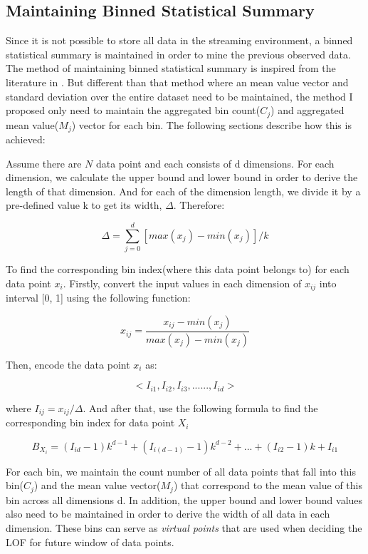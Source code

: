 \documentclass[11pt]{article}       %
\begin{document}
\subsection{Maintaining Binned Statistical Summary} \label{subsect2}

Since it is not possible to store all data in the streaming environment, a binned statistical summary is maintained in order to mine the previous observed data. The method of maintaining binned statistical summary is inspired from the literature in \cite{7516110}. But different than that method where an mean value vector and standard deviation over the entire dataset need to be maintained, the method I proposed only need to maintain the aggregated bin count($C_j$) and aggregated mean value($M_j$) vector for each bin. The following sections describe how this is achieved:

Assume there are $N$ data point and each consists of d dimensions. For each dimension, we calculate the upper bound and lower bound in order to derive the length of that dimension. And for each of the dimension length, we divide it by a pre-defined value k to get its width, $\Delta$.  Therefore:

\[ \Delta = \sum_{j=0}^{d} [max(x_j) - min(x_j)] / k \]

To find the corresponding bin index(where this data point belongs to) for each data point $x_i$. Firstly, convert the input values in each dimension of $x_{ij}$ into interval [0, 1] using the following function:

\[ x_{ij} = \frac{x_{ij} - min(x_j)}{max(x_j) - min(x_j)} \]

Then, encode the data point $x_i$ as:

\[ <I_{i1}, I_{i2}, I_{i3}, ......, I_{id}> \]

where $I_{ij} = x_{ij} / \Delta$. And after that, use the following formula to find the corresponding bin index for data point $X_i$

\begin{equation} \label{bin_index}
B_{X_{i}} = (I_{id} - 1)k^{d-1} + (I_{i(d-1)} - 1)k^{d-2} + ... + (I_{i2} -1)k + I_{i1}
\end{equation}

For each bin, we maintain the count number of all data points that fall into this bin($C_j$) and the mean value vector($M_j$) that correspond to the mean value of this bin across all dimensions d. In addition, the upper bound and lower bound values also need to be maintained in order to derive the width of all data in each dimension. These bins can serve as \textit{virtual points} that are used when deciding the LOF for future window of data points.
\end{document}
